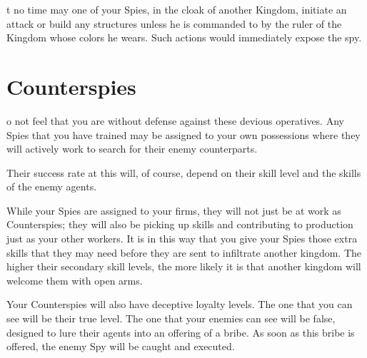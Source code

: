 
t no time may one of your Spies, in the cloak of another Kingdom, initiate an attack or build any structures unless he is commanded to by the ruler of the Kingdom whose colors he wears. Such actions would immediately expose the spy.

\section{Counterspies}


o not feel that you are without defense against these devious operatives. Any Spies that you have trained may be assigned to your own possessions where they will actively work to search for their enemy counterparts.

Their success rate at this will, of course, depend on their skill level and the skills of the enemy agents.

While your Spies are assigned to your firms, they will not just be at work as Counterspies; they will also be picking up skills and contributing to production just as your other workers. It is in this way that you give your Spies those extra skills that they may need before they are sent to infiltrate another kingdom. The higher their secondary skill levels, the more likely it is that another kingdom will welcome them with open arms.

Your Counterspies will also have deceptive loyalty levels. The one that you can see will be their true level. The one that your enemies can see will be false, designed to lure their agents into an offering of a bribe. As soon as this bribe is offered, the enemy Spy will be caught and executed.